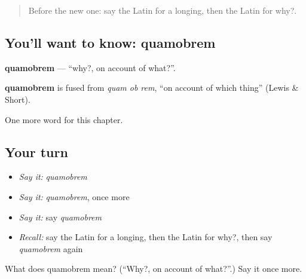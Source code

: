 \label{lesson:LA-C112-quamobrem}



\begin{quote}
Before the new one: say the Latin for a longing, then the Latin for why?.
\end{quote}

\subsection*{You'll want to know: quamobrem}
\textbf{quamobrem} — \textquotedblleft{}why?, on account of what?\textquotedblright{}.

\begin{cousinweb}
\textbf{quamobrem} is fused from \emph{quam ob rem}, \textquotedblleft{}on account of which thing\textquotedblright{} (Lewis \& Short).
\end{cousinweb}

\begin{grammarlens}[title={What you've built}]
One more word for this chapter.
\end{grammarlens}

\subsection*{Your turn}
\begin{itemize}
\raggedright
  \item \emph{Say it:} \emph{quamobrem}
  \item \emph{Say it:} \emph{quamobrem}, once more
  \item \emph{Say it:} say \emph{quamobrem}
  \item \emph{Recall:} say the Latin for a longing, then the Latin for why?, then say \emph{quamobrem} again
\end{itemize}

\begin{tcolorbox}[breakable,colback=teal!4,colframe=teal!35!black,title={Before you move on}]
What does quamobrem mean? (\textquotedblleft{}Why?, on account of what?\textquotedblright{}.) Say it once more.
\end{tcolorbox}
